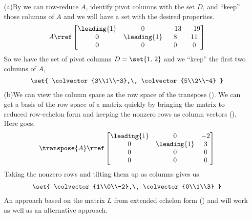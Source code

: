 (a)\quad By  we can row-reduce $A$, identify pivot columns with the set $D$, and ``keep'' those columns of $A$ and we will have a set with the desired properties.  
%
\begin{align*}
A\rref
\begin{bmatrix}
 \leading{1} & 0 & -13 & -19 \\
 0 & \leading{1} & 8 & 11 \\
 0 & 0 & 0 & 0
\end{bmatrix}
\end{align*}
%
So we have the set of pivot columns $D=\set{1,\,2}$ and we ``keep'' the first two columns of $A$,
%
\begin{align*}
\set{
\colvector{3\\1\\-3},\,
\colvector{5\\2\\-4}
}
\end{align*}
%
(b)\quad We can view the column space as the row space of the transpose ().  We can get a basis of the row space of a matrix quickly by bringing the matrix to reduced row-echelon form and keeping the nonzero rows as column vectors ().  Here goes.
%
\begin{align*}
\transpose{A}\rref
%
\begin{bmatrix}
 \leading{1} & 0 & -2 \\
 0 & \leading{1} & 3 \\
 0 & 0 & 0 \\
 0 & 0 & 0
\end{bmatrix}
%
\end{align*}
%
Taking the nonzero rows and tilting them up as columns gives us
%
\begin{align*}
\set{
\colvector{1\\0\\-2},\,
\colvector{0\\1\\3}
}
\end{align*}
%
An approach based on the matrix $L$ from extended echelon form () and  will work as well as an alternative approach.
